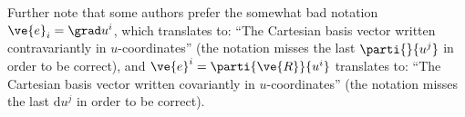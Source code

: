 \documentclass[a4paper, 12pt]{article}
\begin{document}
Further note that some authors prefer the somewhat bad notation $\ve{e}_i = 
\grad u^i$, which translates to: ``The Cartesian basis vector written 
contravariantly in $u$-coordinates'' (the notation misses the last 
$\parti{}{u^j}$ in order to be correct), and $\ve{e}^i = \parti{\ve{R}}{u^i}$ 
translates to: ``The Cartesian basis vector written covariantly in 
$u$-coordinates'' (the notation misses the last $\text{d}u^j$ in order to be 
correct).


\nocite{diverno_1992}
\nocite{arfken_2012}
\nocite{DHaeseleer_1991}
\nocite{wiki_co_cont}
\nocite{wiki_co_trans}
\nocite{diverno_url}
\nocite{physics_forum}
\nocite{wiki_cot_space}
\nocite{mathworld_pseudo}



\end{document}
